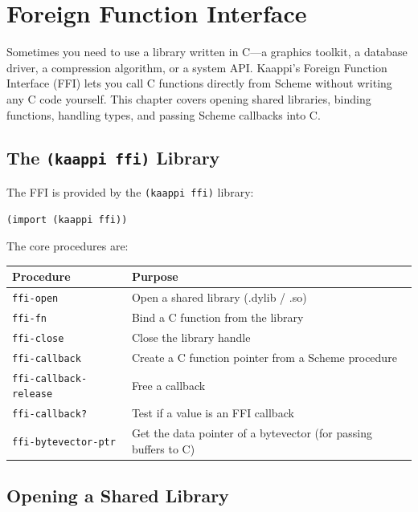 \chapter{Foreign Function Interface}
\label{ch:ffi}

Sometimes you need to use a library written in C---a graphics toolkit, a database driver, a compression algorithm, or a system API. Kaappi's Foreign Function Interface (FFI) lets you call C functions directly from Scheme without writing any C code yourself. This chapter covers opening shared libraries, binding functions, handling types, and passing Scheme callbacks into C.

\section{The \texttt{(kaappi ffi)} Library}

The FFI is provided by the \texttt{(kaappi ffi)} library:

\begin{lstlisting}
(import (kaappi ffi))
\end{lstlisting}

The core procedures are:

\begin{center}
\begin{tabular}{lp{6.5cm}}
\textbf{Procedure} & \textbf{Purpose} \\
\hline
\texttt{ffi-open} & Open a shared library (.dylib / .so) \\
\texttt{ffi-fn} & Bind a C function from the library \\
\texttt{ffi-close} & Close the library handle \\
\texttt{ffi-callback} & Create a C function pointer from a Scheme procedure \\
\texttt{ffi-callback-release} & Free a callback \\
\texttt{ffi-callback?} & Test if a value is an FFI callback \\
\texttt{ffi-bytevector-ptr} & Get the data pointer of a bytevector (for passing buffers to C) \\
\end{tabular}
\end{center}

\section{Opening a Shared Library}

